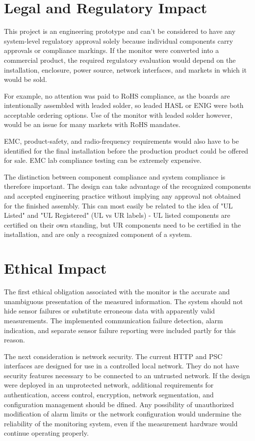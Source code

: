 \section{Legal and Regulatory Impact}

This project is an engineering prototype and can't be considered to have any system-level regulatory approval solely because individual components
carry approvals or compliance markings. If the monitor were converted into a commercial product, the required regulatory evaluation would depend on the installation, enclosure, power source, network interfaces, and markets
in which it would be sold.

For example, no attention was paid to RoHS compliance, as the boards are intentionally assembled with leaded solder, so leaded HASL or ENIG were both acceptable ordering options. Use of the monitor with leaded solder however, would be an issue for many markets with RoHS mandates.

EMC, product-safety, and radio-frequency requirements would also have to be identified for the final installation before the production product could be offered for sale. EMC lab compliance testing can be extremely expensive.

The distinction between component compliance and system compliance is therefore important. The design can take advantage of the recognized components and accepted engineering practice without implying any approval not obtained for the finished assembly. This can most easily be related to the idea of "UL Listed" and "UL Registered" (UL vs UR labels) - UL listed components are certified on their own standing, but UR components need to be certified in the installation, and are only a recognized component of a system.

\section{Ethical Impact}

The first ethical obligation associated with the monitor is the accurate and
unambiguous presentation of the measured information. The system should not hide
sensor failures or substitute erroneous data with apparently valid measurements. The implemented communication failure detection, alarm indication, and separate sensor failure reporting were included partly for this reason.

The next consideration is network security. The current HTTP and PSC interfaces
are designed for use in a controlled local network. They do not have security features necessary to be connected to an untrusted network. If the design were deployed in an unprotected network, additional requirements for authentication, access control, encryption, network segmentation, and configuration management should be dfined. Any possibility of unauthorized modification of alarm limits or the network configuration would undermine the reliability of the monitoring system, even if the measurement hardware would continue operating properly.

